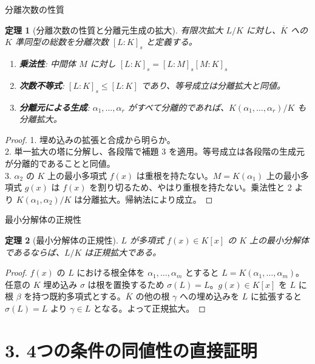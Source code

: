 \documentclass[11pt,dvipsnames]{beamer}
\newtheorem{thm}{定理}
\begin{document}
\begin{frame}[allowframebreaks]{分離次数の性質}
    \begin{thm}[分離次数の性質と分離元生成の拡大]
        有限次拡大 $L/K$ に対し、$\overline{K}$ への $K$ 準同型の総数を分離次数 $[L:K]_s$ と定義する。
        \begin{enumerate}
            \item \textbf{乗法性}: 中間体 $M$ に対し $[L:K]_s = [L:M]_s [M:K]_s$
            \item \textbf{次数不等式}: $[L:K]_s \le [L:K]$ であり、等号成立は分離拡大と同値。
            \item \textbf{分離元による生成}: $\alpha_1, \dots, \alpha_r$ がすべて分離的であれば、$K(\alpha_1, \dots, \alpha_r)/K$ も分離拡大。
        \end{enumerate}
    \end{thm}
    
    \begin{proof}
        1. 埋め込みの拡張と合成から明らか。\\
        2. 単一拡大の塔に分解し、各段階で補題 3 を適用。等号成立は各段階の生成元が分離的であることと同値。\\
        3. $\alpha_2$ の $K$ 上の最小多項式 $f(x)$ は重根を持たない。$M=K(\alpha_1)$ 上の最小多項式 $g(x)$ は $f(x)$ を割り切るため、やはり重根を持たない。乗法性と 2 より $K(\alpha_1, \alpha_2)/K$ は分離拡大。帰納法により成立。
    \end{proof}
\end{frame}

\begin{frame}[allowframebreaks]{最小分解体の正規性}
    \begin{thm}[最小分解体の正規性]
        $L$ が多項式 $f(x) \in K[x]$ の $K$ 上の最小分解体であるならば、$L/K$ は正規拡大である。
    \end{thm}
    
    \begin{proof}
        $f(x)$ の $L$ における根全体を $\alpha_1, \dots, \alpha_m$ とすると $L = K(\alpha_1, \dots, \alpha_m)$。任意の $K$ 埋め込み $\sigma$ は根を置換するため $\sigma(L) = L$。$g(x) \in K[x]$ を $L$ に根 $\beta$ を持つ既約多項式とする。$\overline{K}$ の他の根 $\gamma$ への埋め込みを $L$ に拡張すると $\sigma(L) = L$ より $\gamma \in L$ となる。よって正規拡大。
    \end{proof}
\end{frame}

\section{3. 4つの条件の同値性の直接証明}
\end{document}
